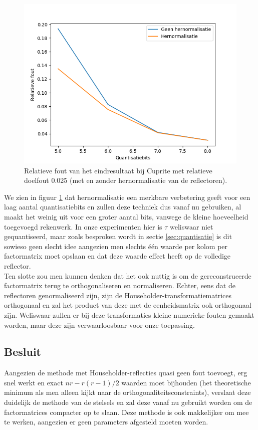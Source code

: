 \begin{figure}[H]
  \centering
  \includegraphics[scale=0.7]{images/orthogonality_compression_householder_quantisation_bits.png}
  \caption{Relatieve fout van het eindresultaat bij Cuprite met relatieve doelfout 0.025 (met en zonder hernormalisatie van de reflectoren).}
\label{fig:orthogonality-compression-householder-quantisation-bits}
\end{figure}

We zien in figuur \ref{fig:orthogonality-compression-householder-quantisation-bits} dat hernormalisatie een merkbare verbetering geeft voor een laag aantal quantisatiebits en zullen deze techniek dus vanaf nu gebruiken, al maakt het weinig uit voor een groter aantal bits, vanwege de kleine hoeveelheid toegevoegd rekenwerk. In onze experimenten hier is $\tau$ weliswaar niet gequantiseerd, maar zoals besproken wordt in sectie \ref{sec:quantisatie} is dit sowieso geen slecht idee aangezien men slechts \'e\'en waarde per kolom per factormatrix moet opslaan en dat deze waarde effect heeft op de volledige reflector.\\

Ten slotte zou men kunnen denken dat het ook nuttig is om de gereconstrueerde factormatrix terug te orthogonaliseren en normaliseren. Echter, eens dat de reflectoren genormaliseerd zijn, zijn de Householder-transformatiematrices orthogonaal en zal het product van deze met de eenheidsmatrix ook orthogonaal zijn. Weliswaar zullen er bij deze transformaties kleine numerieke fouten gemaakt worden, maar deze zijn verwaarloosbaar voor onze toepassing.

\subsection{Besluit}

Aangezien de methode met Householder-reflecties quasi geen fout toevoegt, erg snel werkt en exact $nr - r(r - 1)/2$ waarden moet bijhouden (het theoretische minimum als men alleen kijkt naar de orthogonaliteitsconstraints), verslaat deze duidelijk de methode van de stelsels en zal deze vanaf nu gebruikt worden om de factormatrices compacter op te slaan. Deze methode is ook makkelijker om mee te werken, aangezien er geen parameters afgesteld moeten worden.